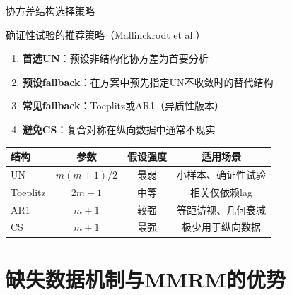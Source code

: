 \documentclass[aspectratio=169,11pt]{beamer}
\begin{document}
\begin{frame}{协方差结构选择策略}
\begin{block}{确证性试验的推荐策略（Mallinckrodt et al.）}
\begin{enumerate}
    \item \textbf{首选UN}：预设非结构化协方差为首要分析
    \item \textbf{预设fallback}：在方案中预先指定UN不收敛时的替代结构
    \item \textbf{常见fallback}：Toeplitz或AR1（异质性版本）
    \item \textbf{避免CS}：复合对称在纵向数据中通常不现实
\end{enumerate}
\end{block}

\vspace{0.2cm}
\begin{center}
\small
\begin{tabular}{lccc}
\toprule
\textbf{结构} & \textbf{参数} & \textbf{假设强度} & \textbf{适用场景} \\
\midrule
UN & $m(m+1)/2$ & 最弱 & 小样本、确证性试验 \\
Toeplitz & $2m-1$ & 中等 & 相关仅依赖lag \\
AR1 & $m+1$ & 较强 & 等距访视、几何衰减 \\
CS & $m+1$ & 最强 & 极少用于纵向数据 \\
\bottomrule
\end{tabular}
\end{center}
\end{frame}

\section{缺失数据机制与MMRM的优势}
\end{document}
